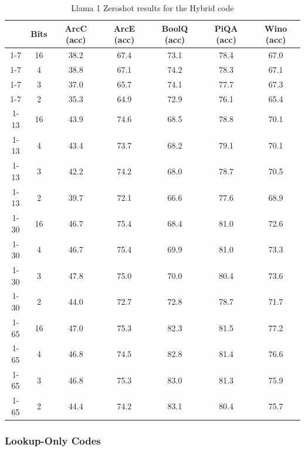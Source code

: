 \begin{table}[h]
\caption{Llama 1 Zeroshot results for the Hybrid code}
\centering
\begin{tabular}{@{}ccccccc@{}}
\toprule
     & Bits & ArcC (acc) & ArcE (acc) & BoolQ (acc) & PiQA (acc) & Wino (acc) \\ \midrule
1-7  & 16   & 38.2       & 67.4       & 73.1        & 78.4       & 67.0       \\
1-7  & 4    & 38.8       & 67.1       & 74.2        & 78.3       & 67.1       \\
1-7  & 3    & 37.0       & 65.7       & 74.1        & 77.7       & 67.3       \\
1-7  & 2    & 35.3       & 64.9       & 72.9        & 76.1       & 65.4       \\
1-13 & 16   & 43.9       & 74.6       & 68.5        & 78.8       & 70.1       \\
1-13 & 4    & 43.4       & 73.7       & 68.2        & 79.1       & 70.1       \\
1-13 & 3    & 42.2       & 74.2       & 68.0        & 78.7       & 70.5       \\
1-13 & 2    & 39.7       & 72.1       & 66.6        & 77.6       & 68.9       \\
1-30 & 16   & 46.7       & 75.4       & 68.4        & 81.0       & 72.6       \\
1-30 & 4    & 46.7       & 75.4       & 69.9        & 81.0       & 73.3       \\
1-30 & 3    & 47.8       & 75.0       & 70.0        & 80.4       & 73.6       \\
1-30 & 2    & 44.0       & 72.7       & 72.8        & 78.7       & 71.7       \\
1-65 & 16   & 47.0       & 75.3       & 82.3        & 81.5       & 77.2       \\
1-65 & 4    & 46.8       & 74.5       & 82.8        & 81.4       & 76.6       \\
1-65 & 3    & 46.8       & 75.3       & 83.0        & 81.3       & 75.9       \\
1-65 & 2    & 44.4       & 74.2       & 83.1        & 80.4       & 75.7       \\ \bottomrule
\end{tabular}
\end{table}

\FloatBarrier
\subsubsection{Lookup-Only Codes}
\label{sec:lutft}



